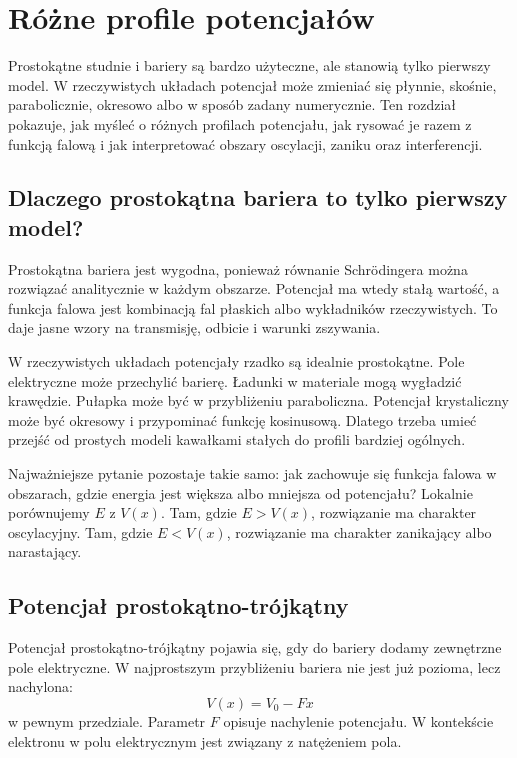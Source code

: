 \chapter{Różne profile potencjałów}

\begin{summarybox}
Prostokątne studnie i bariery są bardzo użyteczne, ale stanowią tylko pierwszy
model. W rzeczywistych układach potencjał może zmieniać się płynnie, skośnie,
parabolicznie, okresowo albo w sposób zadany numerycznie. Ten rozdział pokazuje,
jak myśleć o różnych profilach potencjału, jak rysować je razem z funkcją falową
i jak interpretować obszary oscylacji, zaniku oraz interferencji.
\end{summarybox}

\section{Dlaczego prostokątna bariera to tylko pierwszy model?}

Prostokątna bariera jest wygodna, ponieważ równanie Schrödingera można rozwiązać analitycznie w każdym obszarze. Potencjał ma wtedy stałą wartość, a funkcja falowa jest kombinacją fal płaskich albo wykładników rzeczywistych. To daje jasne wzory na transmisję, odbicie i warunki zszywania.

W rzeczywistych układach potencjały rzadko są idealnie prostokątne. Pole elektryczne może przechylić barierę. Ładunki w materiale mogą wygładzić krawędzie. Pułapka może być w przybliżeniu paraboliczna. Potencjał krystaliczny może być okresowy i przypominać funkcję kosinusową. Dlatego trzeba umieć przejść od prostych modeli kawałkami stałych do profili bardziej ogólnych.

Najważniejsze pytanie pozostaje takie samo: jak zachowuje się funkcja falowa w obszarach, gdzie energia jest większa albo mniejsza od potencjału? Lokalnie porównujemy \(E\) z \(V(x)\). Tam, gdzie \(E>V(x)\), rozwiązanie ma charakter oscylacyjny. Tam, gdzie \(E<V(x)\), rozwiązanie ma charakter zanikający albo narastający.

\section{Potencjał prostokątno-trójkątny}

Potencjał prostokątno-trójkątny pojawia się, gdy do bariery dodamy zewnętrzne pole elektryczne. W najprostszym przybliżeniu bariera nie jest już pozioma, lecz nachylona:
\begin{equation}
    V(x)=V_0-Fx
\end{equation}
w pewnym przedziale. Parametr \(F\) opisuje nachylenie potencjału. W kontekście elektronu w polu elektrycznym jest związany z natężeniem pola.

